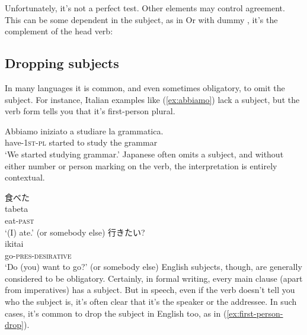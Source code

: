 Unfortunately, it's not a perfect test. Other elements may control agreement. This can be some dependent in the subject, as in  Or with dummy , it's the complement of the head verb:  

\subsection{Dropping subjects}
\label{sec:subject-dropping}
In many languages it is common, and even sometimes obligatory, to omit the subject. For instance, Italian examples like (\ref{ex:abbiamo}) lack a subject, but the verb form tells you that it's first-person plural.

\ea \label{ex:abbiamo}
    \gll Abbiamo iniziato a studiare la grammatica. \\
    have-\textsc{1st-pl} started to study the grammar \\
        \glt `We started studying grammar.'
\z
Japanese often omits a subject, and without either number or person marking on the verb, the interpretation is entirely contextual.

\ea
    \ea \label{ex:tabeta}
    \glll 食べた \\
    tabeta \\
    eat-\textsc{past} \\
    \glt `(I) ate.' (or somebody else)
    \ex \label{ex:ikitai}
    \glll 行きたい? \\
    ikitai \\
    go-\textsc{pres-desirative} \\
    \glt `Do (you) want to go?' (or somebody else)
    \z
\z
English subjects, though, are generally considered to be obligatory. Certainly, in formal writing, every main clause (apart from imperatives) has a subject. But in speech, even if the verb doesn't tell you who the subject is, it's often clear that it's the speaker or the addressee. In such cases, it's common to drop the subject  in English too, as in (\ref{ex:first-person-drop}).

